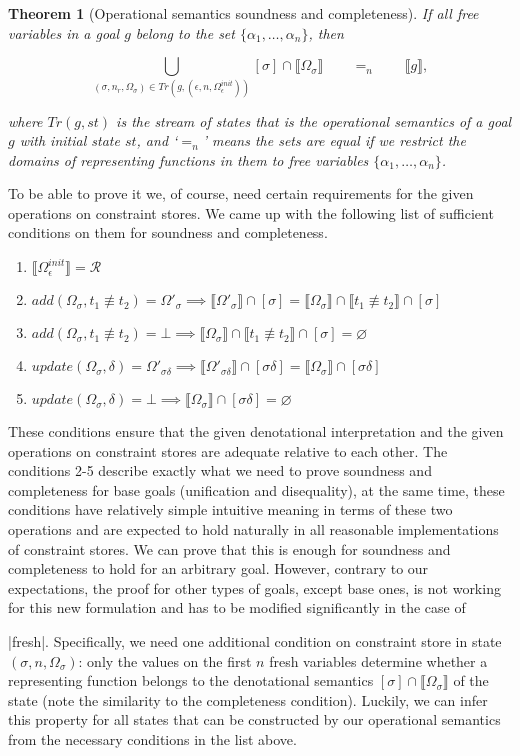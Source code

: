 \documentclass[submission,copyright,creativecommons]{eptcs}
\newtheorem{theorem}{Theorem}
\newcommand*{\SavedLstInline}{}
\DeclareRobustCommand*{\lstinline}{%
  \ifmmode
    \let\SavedBGroup\bgroup
    \def\bgroup{%
      \let\bgroup\SavedBGroup
      \hbox\bgroup
    }%
  \fi
  \SavedLstInline
}
\newcommand{\sembr}[1]{\llbracket{#1}\rrbracket}
\newcommand{\diseq}{\not\equiv}
\newcommand{\reprfunset}{\mathcal{R}}
\newcommand{\cstore}{\Omega}
\newcommand{\cstoreinit}{\cstore_\epsilon^{init}}
\newcommand{\csadd}[3]{add(#1, #2 \diseq #3)}  %
\newcommand{\csupdate}[2]{update(#1, #2)}  %
\let\emptyset\varnothing
\begin{document}
\begin{theorem}[Operational semantics soundness and completeness]
If all free variables in a goal $g$ belong to the set $\{\alpha_1,\dots,\alpha_n\}$, then

\[
\bigcup_{(\sigma, n_r, \cstore_\sigma) \in Tr(g, (\epsilon, n, \cstoreinit))}  {[\sigma] \cap \sembr{\cstore_\sigma}}  \qquad =_n \qquad \sembr{g},
\]

where $Tr(g, st)$ is the stream of states that is the operational semantics of a goal $g$ with initial state $st$, and `$=_n$' means the sets are equal if we restrict the domains of representing functions in them to free variables $\{\alpha_1,\dots,\alpha_n\}$.
\end{theorem}

To be able to prove it we, of course, need certain requirements for the given operations on constraint stores. We came up with the following list of sufficient conditions on them for soundness and completeness.

\begin{enumerate}
\item $\sembr{\cstoreinit} = \reprfunset$
\item $\csadd{\cstore_\sigma}{t_1}{t_2} = \cstore'_\sigma \implies \sembr{\cstore'_\sigma} \cap [\sigma] = \sembr{\cstore_\sigma} \cap \sembr{t_1 \diseq t_2} \cap [\sigma]$
\item $\csadd{\cstore_\sigma}{t_1}{t_2} = \bot \implies \sembr{\cstore_\sigma} \cap \sembr{t_1 \diseq t_2} \cap [\sigma] = \emptyset$
\item $\csupdate{\cstore_\sigma}{\delta} = \cstore'_{\sigma \delta} \implies \sembr{\cstore'_{\sigma \delta}} \cap [\sigma \delta] = \sembr{\cstore_\sigma} \cap [\sigma \delta]$
\item $\csupdate{\cstore_\sigma}{\delta} = \bot \implies \sembr{\cstore_\sigma} \cap [\sigma \delta] = \emptyset$
\end{enumerate}

These conditions ensure that the given denotational interpretation and the given operations on constraint stores are adequate relative to each other. The conditions 2-5 describe exactly what we need to prove soundness and completeness for base goals (unification and disequality), at the same time, these conditions have relatively simple intuitive meaning in terms of these two operations and are expected to hold naturally in all reasonable implementations of constraint stores. We can prove that this is enough for soundness and completeness to hold for an arbitrary goal. However, contrary to our expectations, the proof for other types of goals, except base ones, is not working for this new formulation and has to be modified significantly in the case of \lstinline|fresh|. Specifically, we need one additional condition on constraint store in state $(\sigma, n, \cstore_\sigma)$: only the values on the first $n$ fresh variables determine whether a representing function belongs to the denotational semantics $[\sigma] \cap \sembr{\cstore_\sigma}$ of the state (note the similarity to the completeness condition). Luckily, we can infer this property for all states that can be constructed by our operational semantics from the necessary conditions in the list above.
\end{document}
